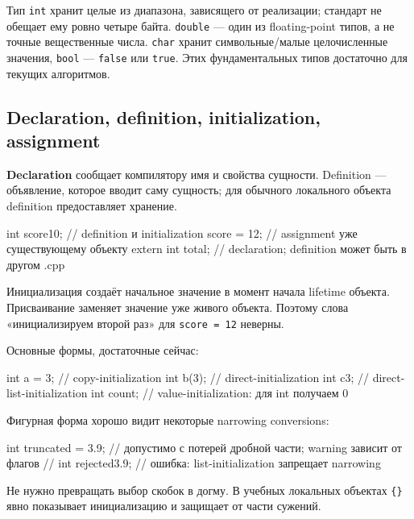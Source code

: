 Тип \texttt{int} хранит целые из диапазона, зависящего от реализации;
стандарт не обещает ему ровно четыре байта. \texttt{double} --- один из
floating-point типов, а не точные вещественные числа. \texttt{char} хранит
символьные/малые целочисленные значения, \texttt{bool} --- \texttt{false} или
\texttt{true}. Этих фундаментальных типов достаточно для текущих алгоритмов.

\subsection{Declaration, definition, initialization, assignment}

\begin{definition}
\textbf{Declaration} сообщает компилятору имя и свойства сущности. Definition
--- объявление, которое вводит саму сущность; для
обычного локального объекта definition предоставляет хранение.
\end{definition}

\begin{cppcode}
int score{10};       // definition и initialization
score = 12;          // assignment уже существующему объекту
extern int total;    // declaration; definition может быть в другом .cpp
\end{cppcode}

Инициализация создаёт начальное значение в момент начала lifetime объекта.
Присваивание заменяет значение уже живого объекта. Поэтому слова
«инициализируем второй раз» для \texttt{score = 12} неверны.

Основные формы, достаточные сейчас:

\begin{cppcode}
int a = 3;     // copy-initialization
int b(3);      // direct-initialization
int c{3};      // direct-list-initialization
int count{};   // value-initialization: для int получаем 0
\end{cppcode}

Фигурная форма хорошо видит некоторые narrowing conversions:

\begin{cppcode}
int truncated = 3.9; // допустимо с потерей дробной части; warning зависит от флагов
// int rejected{3.9}; // ошибка: list-initialization запрещает narrowing
\end{cppcode}

Не нужно превращать выбор скобок в догму. В учебных локальных объектах
\texttt{\{\}} явно показывает инициализацию и защищает от части сужений.

